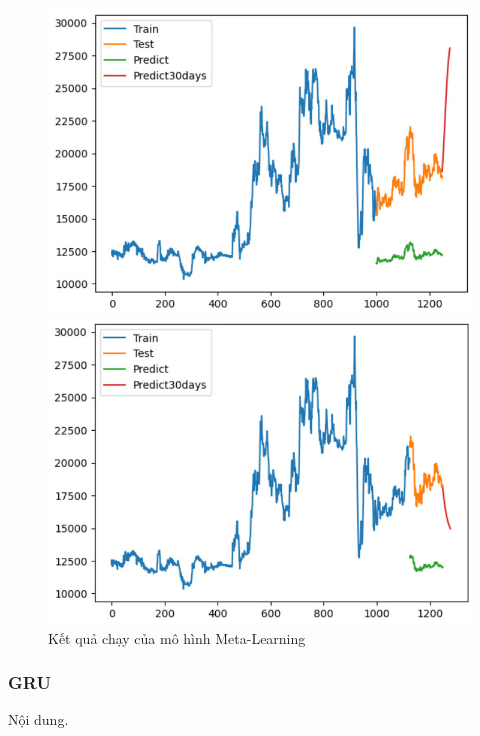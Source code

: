 \begin{figure}[H]
\begin{minipage}{0.15\textwidth}
    \includegraphics[width=1\textwidth]{resources/chapter-5/result/EXB_LSTM_8_2.jpg}
    \end{minipage}
    \hfill
        \begin{minipage}{0.15\textwidth}
    \centering
    \includegraphics[width=1\textwidth]{resources/chapter-5/result/EXB_LSTM_9_1.jpg}
    \end{minipage}
    \hfill
    
    \caption{Kết quả chạy của mô hình Meta-Learning}
    \label{fig:ml_result}
\end{figure}
\subsubsection{GRU}
Nội dung.


